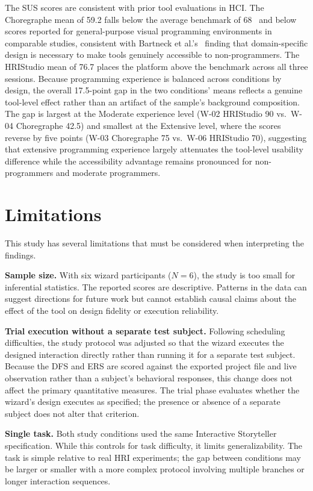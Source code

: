 The SUS scores are consistent with prior tool evaluations in HCI. The Choregraphe mean of 59.2 falls below the average benchmark of 68~\cite{Brooke1996} and below scores reported for general-purpose visual programming environments in comparable studies, consistent with Bartneck et al.'s~\cite{Bartneck2024} finding that domain-specific design is necessary to make tools genuinely accessible to non-programmers. The HRIStudio mean of 76.7 places the platform above the benchmark across all three sessions. Because programming experience is balanced across conditions by design, the overall 17.5-point gap in the two conditions' means reflects a genuine tool-level effect rather than an artifact of the sample's background composition. The gap is largest at the Moderate experience level (W-02 HRIStudio 90 vs.\ W-04 Choregraphe 42.5) and smallest at the Extensive level, where the scores reverse by five points (W-03 Choregraphe 75 vs.\ W-06 HRIStudio 70), suggesting that extensive programming experience largely attenuates the tool-level usability difference while the accessibility advantage remains pronounced for non-programmers and moderate programmers.

\section{Limitations}

This study has several limitations that must be considered when interpreting the findings.

\textbf{Sample size.} With six wizard participants ($N = 6$), the study is too small for inferential statistics. The reported scores are descriptive. Patterns in the data can suggest directions for future work but cannot establish causal claims about the effect of the tool on design fidelity or execution reliability.

\textbf{Trial execution without a separate test subject.} Following scheduling difficulties, the study protocol was adjusted so that the wizard executes the designed interaction directly rather than running it for a separate test subject. Because the DFS and ERS are scored against the exported project file and live observation rather than a subject's behavioral responses, this change does not affect the primary quantitative measures. The trial phase evaluates whether the wizard's design executes as specified; the presence or absence of a separate subject does not alter that criterion.

\textbf{Single task.} Both study conditions used the same Interactive Storyteller specification. While this controls for task difficulty, it limits generalizability. The task is simple relative to real HRI experiments; the gap between conditions may be larger or smaller with a more complex protocol involving multiple branches or longer interaction sequences.

